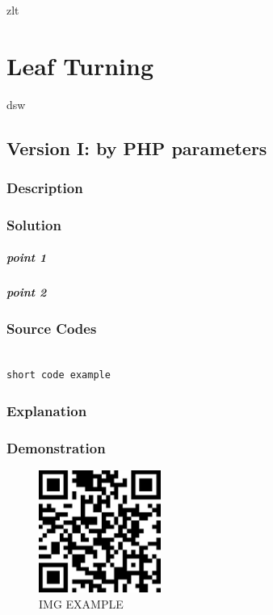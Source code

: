 \documentclass{book}
\begin{document}
zlt





\chapter{Leaf Turning}

dsw

\section{Version I: by PHP parameters}

\subsection{Description}

\subsection{Solution}

\paragraph{point 1}

\paragraph{point 2}

\subsection{Source Codes}

\begin{minipage}[r]{15em}
\begin{verbatim}

short code example

\end{verbatim}
\end{minipage}

\subsection{Explanation}

\subsection{Demonstration}

\begin{figure}[H]
\centering
\includegraphics[height=4.0cm,width=4.0cm]{img/dsw_1.jpg}
\caption{IMG EXAMPLE}
\end{figure}
\end{document}
